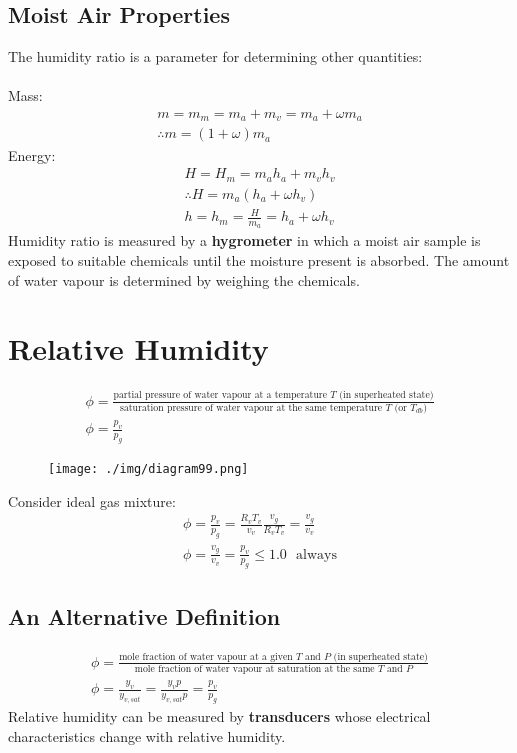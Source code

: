 \subsection{Moist Air Properties}
The humidity ratio is a parameter for determining other quantities: \\\\
Mass:
\begin{gather}
  m = m_m = m_a + m_v = m_a + \omega m_a \\[5pt]
  \therefore m = (1+\omega)m_a
\end{gather}
Energy:
\begin{gather}
  H = H_m = m_ah_a + m_vh_v \\[5pt]
  \therefore H = m_a(h_a + \omega h_v) \\[5pt]
  h = h_m = \frac{H}{m_a} = h_a + \omega h_v
\end{gather}
Humidity ratio is measured by a \textbf{hygrometer} in which a moist air sample is exposed to suitable chemicals until the moisture present is absorbed. The amount of water vapour is determined by weighing the chemicals.
\section{Relative Humidity}
\begin{gather}
  \phi = \frac{\text{partial pressure of water vapour at a temperature $T$ (in superheated state)}}{\text{saturation pressure of water vapour at the same temperature $T$ (or $T_{db}$)}} \\[5pt]
  \phi = \frac{p_v}{p_g}
\end{gather}
\begin{figure}[H]
  \centering
  \texttt{[image: ./img/diagram99.png]}
  \caption{}
\end{figure}
Consider ideal gas mixture:
\begin{gather}
  \phi = \frac{p_v}{p_g} = \frac{R_v T_v}{v_v}\frac{v_g}{R_v T_v} = \frac{v_g}{v_v} \\[5pt]
  \phi = \frac{v_g}{v_v} = \frac{p_v}{p_g} \leq 1.0 \ \ \ \text{always}
\end{gather}
\subsection{An Alternative Definition}
\begin{gather}
  \phi = \frac{\text{mole fraction of water vapour at a given $T$ and $P$ (in superheated state)}}{\text{mole fraction of water vapour at saturation at the same $T$ and $P$}} \\[5pt]
  \phi = \frac{y_v}{y_{v,sat}} = \frac{y_vp}{y_{v,sat}p} = \frac{p_v}{p_g}
\end{gather}
Relative humidity can be measured by \textbf{transducers} whose electrical characteristics change with relative humidity.
